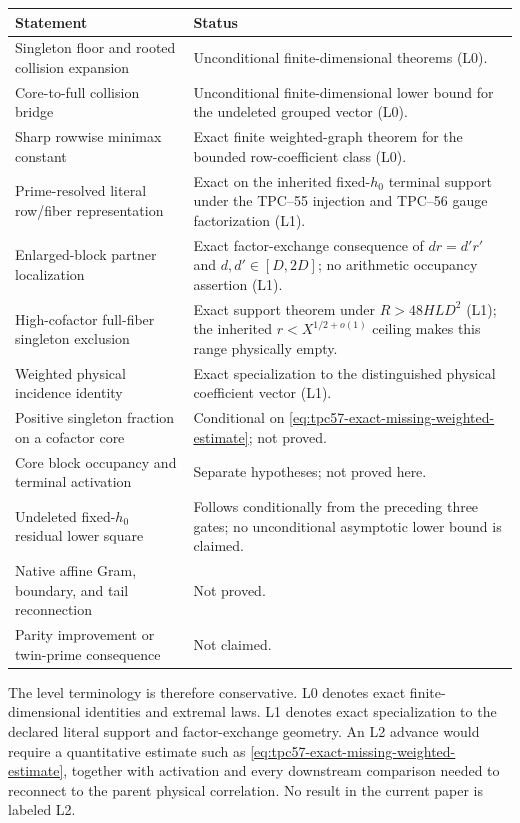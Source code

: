 \begin{center}
\small
\begin{tabular}{>{\raggedright\arraybackslash}p{}
                >{\raggedright\arraybackslash}p{}}
\toprule
Statement & Status \\
\midrule
Singleton floor and rooted collision expansion
& Unconditional finite-dimensional theorems (L0). \\
Core-to-full collision bridge
& Unconditional finite-dimensional lower bound for the undeleted grouped
  vector (L0). \\
Sharp rowwise minimax constant
& Exact finite weighted-graph theorem for the bounded row-coefficient class
  (L0). \\
Prime-resolved literal row/fiber representation
& Exact on the inherited fixed-\(h_0\) terminal support under the TPC--55
  injection and TPC--56 gauge factorization (L1). \\
Enlarged-block partner localization
& Exact factor-exchange consequence of \(dr=d'r'\) and
  \(d,d'\in[D,2D]\); no arithmetic occupancy assertion (L1). \\
High-cofactor full-fiber singleton exclusion
& Exact support theorem under \(R>48HLD^2\) (L1); the inherited
  \(r<X^{1/2+o(1)}\) ceiling makes this range physically empty. \\
Weighted physical incidence identity
& Exact specialization to the distinguished physical coefficient vector
  (L1). \\
Positive singleton fraction on a cofactor core
& Conditional on
  \eqref{eq:tpc57-exact-missing-weighted-estimate}; not proved. \\
Core block occupancy and terminal activation
& Separate hypotheses; not proved here. \\
Undeleted fixed-\(h_0\) residual lower square
& Follows conditionally from the preceding three gates; no unconditional
  asymptotic lower bound is claimed. \\
Native affine Gram, boundary, and tail reconnection
& Not proved. \\
Parity improvement or twin-prime consequence
& Not claimed. \\
\bottomrule
\end{tabular}
\end{center}

The level terminology is therefore conservative.  L0 denotes exact
finite-dimensional identities and extremal laws.  L1 denotes exact
specialization to the declared literal support and factor-exchange geometry.
An L2 advance would require a quantitative estimate such as
\eqref{eq:tpc57-exact-missing-weighted-estimate}, together with activation
and every downstream comparison needed to reconnect to the parent physical
correlation.  No result in the current paper is labeled L2.

